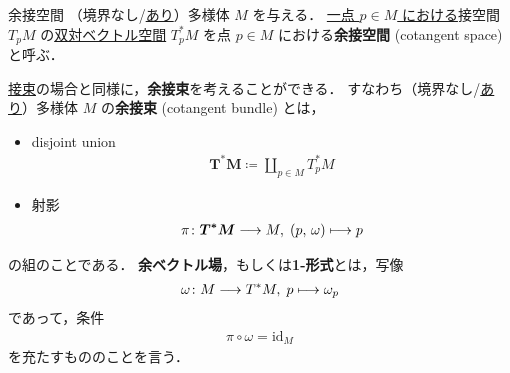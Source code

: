 \documentclass[geometry_main]{subfiles}
\begin{document}
\begin{mydef}[label=def.cotangentv]{余接空間}
	（境界なし/\hyperref[def:mani-with-boundary]{あり}）\cinfty 多様体 $M$ を与える．
	\underline{一点 $p \in M$ における}接空間 $T_pM$ の\hyperref[def.dualspace]{双対ベクトル空間} $T^*_pM$ を点 $p \in M$ における\textbf{余接空間} (cotangent space) と呼ぶ．
\end{mydef}

\hyperref[def:bundle-tangent]{接束}の場合と同様に，\textbf{余接束}を考えることができる．
すなわち（境界なし/\hyperref[def:mani-with-boundary]{あり}）\cinfty 多様体 $M$ の\textbf{余接束} (cotangent bundle) とは，
\begin{itemize}
	\item disjoint union 
	\begin{align}
		\bm{T^* M} \coloneqq \coprod_{p \in M} T_p^* M
	\end{align}
	\item 射影
	\begin{align}
		\pi \colon \bm{T^* M} \longrightarrow M,\; (p,\, \omega) \longmapsto p
	\end{align}
\end{itemize}
の組のことである．
\textbf{余ベクトル場}，もしくは\textbf{1-形式}とは，\cinfty 写像
\begin{align}
	\omega \colon M \longrightarrow T^* M,\; p \longmapsto \omega_p
\end{align}
であって，条件
\begin{align}
	\pi \circ \omega = \mathrm{id}_M
\end{align}
を充たすもののことを言う．






\end{document}
